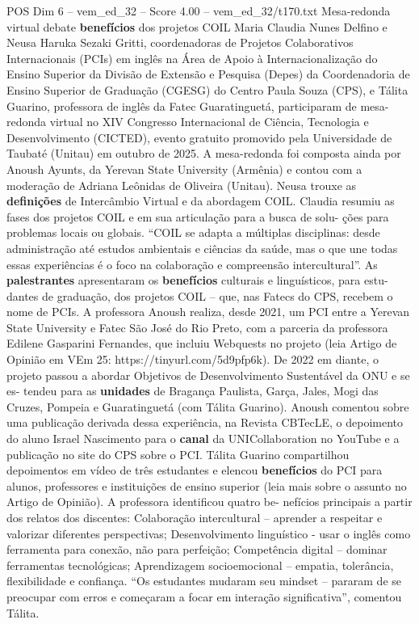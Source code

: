 \begin{textsample}{POS Dim 6 – vem\_ed\_32 – Score 4.00 – vem\_ed\_32/t170.txt}  \label{ex:f6_pos_006}
Mesa-redonda virtual debate \textbf{benefícios} dos projetos COIL Maria Claudia Nunes Delfino e Neusa Haruka Sezaki Gritti, coordenadoras de Projetos Colaborativos Internacionais (PCIs) em inglês na Área de Apoio à Internacionalização do Ensino Superior da Divisão de Extensão e Pesquisa (Depes) da Coordenadoria de Ensino Superior de Graduação (CGESG) do Centro Paula Souza (CPS), e Tálita Guarino, professora de inglês da Fatec Guaratinguetá, participaram de mesa-redonda virtual no XIV Congresso Internacional de Ciência, Tecnologia e Desenvolvimento (CICTED), evento gratuito promovido pela Universidade de Taubaté (Unitau) em outubro de 2025.
A mesa-redonda foi composta ainda por Anoush Ayunts, da Yerevan State University (Armênia) e contou com a moderação de Adriana Leônidas de Oliveira (Unitau).
Neusa trouxe as \textbf{definições} de Intercâmbio Virtual e da abordagem COIL.
Claudia resumiu as fases dos projetos COIL e em sua articulação para a busca de solu- ções para problemas locais ou globais. “COIL se adapta a múltiplas disciplinas: desde administração até estudos ambientais e ciências da saúde, mas o que une todas essas experiências é o foco na colaboração e compreensão intercultural”.
As \textbf{palestrantes} apresentaram os \textbf{benefícios} culturais e linguísticos, para estu- dantes de graduação, dos projetos COIL – que, nas Fatecs do CPS, recebem o nome de PCIs.
A professora Anoush realiza, desde 2021, um PCI entre a Yerevan State University e Fatec São José do Rio Preto, com a parceria da professora Edilene Gasparini Fernandes, que incluiu Webquests no projeto (leia Artigo de Opinião em VEm 25: https://tinyurl.com/5d9pfp6k).
De 2022 em diante, o projeto passou a abordar Objetivos de Desenvolvimento Sustentável da ONU e se es- tendeu para as \textbf{unidades} de Bragança Paulista, Garça, Jales, Mogi das Cruzes, Pompeia e Guaratinguetá (com Tálita Guarino).
Anoush comentou sobre uma publicação derivada dessa experiência, na Revista CBTecLE, o depoimento do aluno Israel Nascimento para o \textbf{canal} da UNICollaboration no YouTube e a publicação no site do CPS sobre o PCI.
Tálita Guarino compartilhou depoimentos em vídeo de três estudantes e elencou \textbf{benefícios} do PCI para alunos, professores e instituições de ensino superior (leia mais sobre o assunto no Artigo de Opinião).
A professora identificou quatro be- nefícios principais a partir dos relatos dos discentes: Colaboração intercultural – aprender a respeitar e valorizar diferentes perspectivas; Desenvolvimento linguístico - usar o inglês como ferramenta para conexão, não para perfeição; Competência digital – dominar ferramentas tecnológicas; Aprendizagem socioemocional – empatia, tolerância, flexibilidade e confiança. “Os estudantes mudaram seu mindset – pararam de se preocupar com erros e começaram a focar em interação significativa”, comentou Tálita.

\end{textsample}
